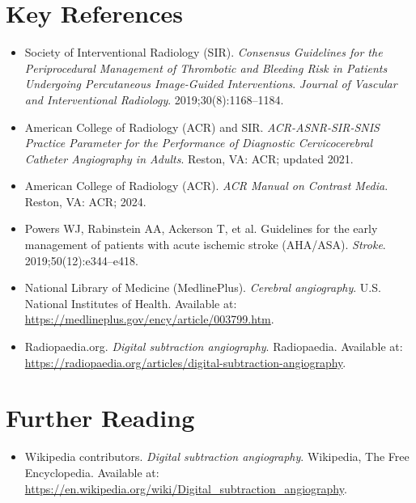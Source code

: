 \section{Key References}
\begin{itemize}
\item Society of Interventional Radiology (SIR). \textit{Consensus Guidelines for the Periprocedural Management of Thrombotic and Bleeding Risk in Patients Undergoing Percutaneous Image-Guided Interventions}. \textit{Journal of Vascular and Interventional Radiology}. 2019;30(8):1168--1184.
\item American College of Radiology (ACR) and SIR. \textit{ACR-ASNR-SIR-SNIS Practice Parameter for the Performance of Diagnostic Cervicocerebral Catheter Angiography in Adults}. Reston, VA: ACR; updated 2021.
\item American College of Radiology (ACR). \textit{ACR Manual on Contrast Media}. Reston, VA: ACR; 2024.
\item Powers WJ, Rabinstein AA, Ackerson T, et al. Guidelines for the early management of patients with acute ischemic stroke (AHA/ASA). \textit{Stroke}. 2019;50(12):e344--e418.
\item National Library of Medicine (MedlinePlus). \textit{Cerebral angiography}. U.S. National Institutes of Health. Available at: \url{https://medlineplus.gov/ency/article/003799.htm}.
\item Radiopaedia.org. \textit{Digital subtraction angiography}. Radiopaedia. Available at: \url{https://radiopaedia.org/articles/digital-subtraction-angiography}.
\end{itemize}

\section{Further Reading}
\begin{itemize}
  \item Wikipedia contributors. \textit{Digital subtraction angiography}. Wikipedia, The Free Encyclopedia. Available at: \url{https://en.wikipedia.org/wiki/Digital_subtraction_angiography}.
\end{itemize}
